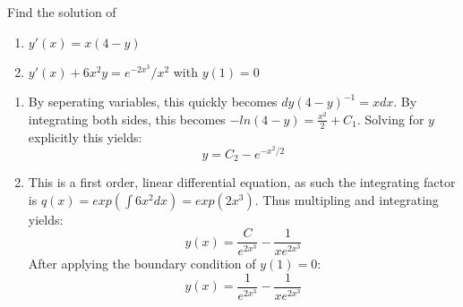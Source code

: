 Find the solution of 
\begin{enumerate}
	\item $y\prime(x)=x(4-y)$
	\item $y\prime(x)+6x^2y=e^{-2x^3}/x^2$ with $y(1)=0$
\end{enumerate}

\begin{enumerate}
	\item By seperating variables, this quickly becomes $dy(4-y)^{-1}=xdx$. By integrating both sides, this becomes $-ln(4-y)=\frac{x^2}{2}+C_1$. Solving for $y$ explicitly this yields:
	\begin{equation*}
	\boxed{
		y=C_2-e^{-x^2/2}
		}
	\end{equation*}
	
	\item This is a first order, linear differential equation, as such the integrating factor is $q(x)=exp(\int 6x^2dx)=exp(2x^3)$. Thus multipling and integrating yields:
	\begin{equation*}
		y(x)=\frac{C}{e^{2x^3}}-\frac{1}{xe^{2x^3}}
	\end{equation*}
	After applying the boundary condition of $y(1)=0$:
	\begin{equation*}
	\boxed{
		y(x)=\frac{1}{e^{2x^3}}-\frac{1}{xe^{2x^3}}}
	\end{equation*}
\end{enumerate}
